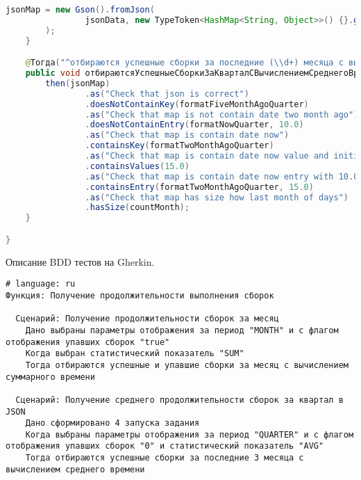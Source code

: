 \begin{lstlisting}[language=Java]
        jsonMap = new Gson().fromJson(
                jsonData, new TypeToken<HashMap<String, Object>>() {}.getType()
        );
    }

    @Тогда("^отбираются успешные сборки за последние (\\d+) месяца с вычислением среднего времени$")
    public void отбираютсяУспешныеСборкиЗаКварталСВычислениемСреднегоВремени(int countMonth) throws Throwable {
        then(jsonMap)
                .as("Check that json is correct")
                .doesNotContainKey(formatFiveMonthAgoQuarter)
                .as("Check that map is not contain date two month ago")
                .doesNotContainEntry(formatNowQuarter, 10.0)
                .as("Check that map is contain date now")
                .containsKey(formatTwoMonthAgoQuarter)
                .as("Check that map is contain date now value and initial values")
                .containsValues(15.0)
                .as("Check that map is contain date now entry with 10.0 time build duration")
                .containsEntry(formatTwoMonthAgoQuarter, 15.0)
                .as("Check that map has size how last month of days")
                .hasSize(countMonth);
    }

}

\end{lstlisting}

Описание BDD тестов на Gherkin.

\begin{lstlisting}
# language: ru
Функция: Получение продолжительности выполнения сборок

  Сценарий: Получение продолжительности сборок за месяц
    Дано выбраны параметры отображения за период "MONTH" и с флагом отображения упавших сборок "true"
    Когда выбран статистический показатель "SUM"
    Тогда отбираются успешные и упавшие сборки за месяц с вычислением суммарного времени

  Сценарий: Получение среднего продолжительности сборок за квартал в JSON
    Дано сформировано 4 запуска задания
    Когда выбраны параметры отображения за период "QUARTER" и с флагом отображения упавших сборок "0" и статистический показатель "AVG"
    Тогда отбираются успешные сборки за последние 3 месяца с вычислением среднего времени
\end{lstlisting}


